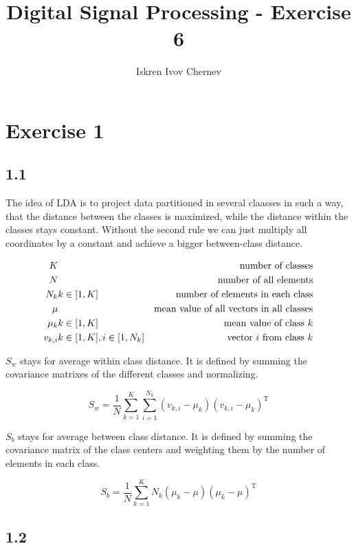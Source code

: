 \documentclass[a4paper]{article}
\def\T{\mathrm{T}}
\begin{document}
\title{Digital Signal Processing - Exercise 6}
\author{Iskren Ivov Chernev}
\maketitle

\section*{Exercise 1}

\subsection*{1.1}

The idea of LDA is to project data partitioned in several claasses in such
a way, that the distance between the classes is maximized, while the distance
within the classes stays constant. Without the second rule we can just multiply
all coordinates by a constant and achieve a bigger between-class distance.

\begin{eqnarray*}
K && \text{number of classes} \\
N && \text{number of all elements} \\
N_k & k \in [1,K] & \text{number of elements in each class} \\
\mu && \text{mean value of all vectors in all classes} \\
\mu_k & k \in [1,K] & \text{mean value of class $ k $} \\
v_{k,i} & k \in [1,K], i \in [1, N_k] & \text{vector $ i $ from class $ k $} \\
\end{eqnarray*}

$ S_w $ stays for average within class distance. It is defined by summing the
covariance matrixes of the different classes and normalizing.

\[
  S_w = \frac{1}{N} \sum_{k = 1}^{K} \sum_{i = 1}^{N_k} (v_{k,i} - \mu_k)(v_{k,i} - \mu_k)^\T
\]

$ S_b $ stays for average between class distance. It is defined by summing the
covariance matrix of the class centers and weighting them by the number of
elements in each class.

\[
  S_b = \frac{1}{N} \sum_{k=1}^K N_k (\mu_k - \mu)(\mu_k - \mu)^\T
\]

\subsection*{1.2}
\end{document}
